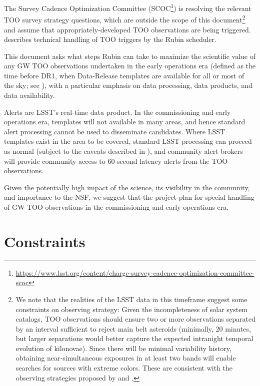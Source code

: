 \documentclass[DM,authoryear,toc]{lsstdoc}
\begin{document}
The Survey Cadence Optimization Committee (SCOC\footnote{\url{https://www.lsst.org/content/charge-survey-cadence-optimization-committee-scoc}}) is resolving the relevant TOO survey strategy questions, which are outside the scope of this document\footnote{We note that the realities of the LSST data in this timeframe suggest some constraints on observing strategy:  
Given the incompleteness of solar system catalogs, TOO observations should ensure two or more observations separated by an interval sufficient to reject main belt asteroids (minimally, 20 minutes, but larger separations would better capture the expected intranight temporal evolution of kilonovae).  
Since there will be minimal variability history, obtaining near-simultaneous exposures in at least two bands will enable searches for sources with extreme colors.  
These are consistent with the observing strategies proposed by \citet{2018arXiv181204051M} and \citet{2022ApJS..260...18A}.} and assume that appropriately-developed TOO observations are being triggered.
 describes technical handling of TOO triggers by the Rubin scheduler.

This document asks what steps Rubin can take to maximize the scientific value of any GW TOO observations undertaken in the early operations era (defined as the time before DR1, when Data-Release templates are available for all or most of the sky; see ), with a particular emphasis on data processing, data products, and data availability.

Alerts are LSST's real-time data product.  
In the commissioning and early operations era, 
templates will not available in many areas, and hence standard alert processing cannot be used to disseminate candidates.
Where LSST templates exist in the area to be covered, standard LSST processing can proceed as normal (subject to the caveats described in ), and community alert brokers will provide community access to 60-second latency alerts from the TOO observations.

Given the potentially high impact of the science, its visibility in the community, and importance to the NSF, we suggest that the project plan for special handling of GW TOO observations in the commissioning and early operations era.  

\section{Constraints} \label{sec:constraints}
\end{document}
